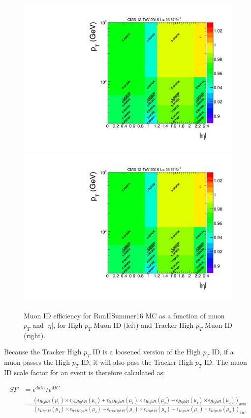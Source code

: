 \begin{figure}[htbp]
\begin{center}
\includegraphics[width=0.49\linewidth, page=5]{figures/bg_muonidisoeff.pdf}
\includegraphics[width=0.49\linewidth, page=6]{figures/bg_muonidisoeff.pdf}
\caption{Muon ID efficiency for RunIISummer16 MC as a function of muon $p_T$ and $|\eta|$, for High $p_T$ Muon ID (left) and Tracker High $p_T$ Muon ID (right).}
\label{fig:bg_muonmcideff}
\end{center}
\end{figure}

\vspace{0.3cm}
Because the Tracker High $p_T$ ID is a loosened version of the High $p_T$ ID, if a muon passes the High $p_T$ ID, it will also pass the Tracker High $p_T$ ID. The muon ID scale factor for an event is therefore calculated as:
\begin{small}
\begin{align*}
SF & =\epsilon^{data}/\epsilon^{MC} \\
 & =\frac{(\epsilon_{HighPt}(\mu_1)\times \epsilon_{trkHighPt}(\mu_2)+\epsilon_{trkHighPt}(\mu_1)\times \epsilon_{HighPt}(\mu_2)-\epsilon_{HighPt}(\mu_1)\times \epsilon_{HighPt}(\mu_2))_{data}}{(\epsilon_{HighPt}(\mu_1)\times \epsilon_{trkHighPt}(\mu_2)+\epsilon_{trkHighPt}(\mu_1)\times \epsilon_{HighPt}(\mu_2)-\epsilon_{HighPt}(\mu_1)\times \epsilon_{HighPt}(\mu_2))_{MC}}
\end{align*}
\end{small}

